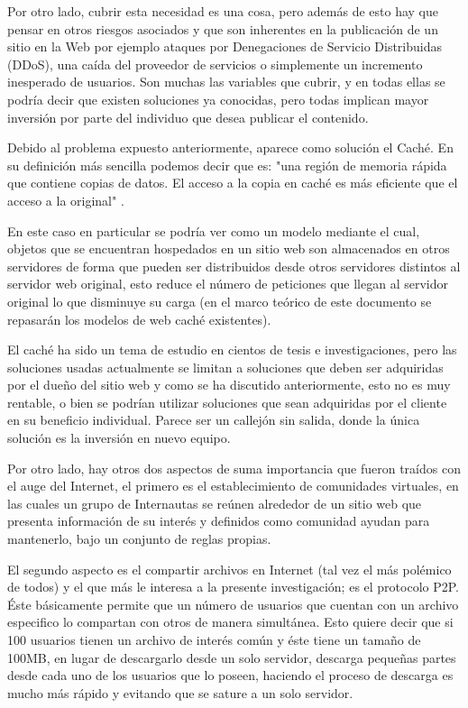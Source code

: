 Por otro lado, cubrir esta necesidad es una cosa, pero además de esto hay que pensar en otros riesgos asociados y que son inherentes en la publicación de un sitio en la Web por ejemplo ataques por Denegaciones de Servicio Distribuidas (DDoS), una caída del proveedor de servicios o simplemente un incremento inesperado de usuarios. Son muchas las variables que cubrir, y en todas ellas se podría decir que existen soluciones ya conocidas, pero todas implican mayor inversión por parte del individuo que desea publicar el contenido. 

Debido al problema expuesto anteriormente, aparece como solución el Caché. En su definición más sencilla podemos decir que es: "una región de memoria rápida que contiene copias de datos. El acceso a la copia en caché es más eficiente que el acceso a la original" \cite{silberschatz:2008}. 

En este caso en particular se podría ver como un modelo mediante el cual, objetos que se encuentran hospedados en un sitio web son almacenados en otros servidores de forma que pueden ser distribuidos desde otros servidores distintos al servidor web original, esto reduce el número de peticiones que llegan al servidor original lo que disminuye su carga (en el marco teórico de este documento se repasarán los modelos de web caché existentes). 

El caché ha sido un tema de estudio en cientos de tesis e investigaciones, pero las soluciones usadas actualmente se limitan a soluciones que deben ser adquiridas por el dueño del sitio web y como se ha discutido anteriormente, esto no es muy rentable, o bien se podrían utilizar soluciones que sean adquiridas por el cliente en su beneficio individual. Parece ser un callejón sin salida, donde la única solución es la inversión en nuevo equipo.

Por otro lado, hay otros dos aspectos de suma importancia que fueron traídos con el auge del Internet, el primero es el establecimiento de comunidades virtuales, en las cuales un grupo de Internautas se reúnen alrededor de un sitio web que presenta información de su interés y definidos como comunidad ayudan para mantenerlo, bajo un conjunto de reglas propias. 

El segundo aspecto es el compartir archivos en Internet (tal vez el más polémico de todos) y el que más le interesa a la presente investigación; es el protocolo P2P. Éste básicamente permite que un número de usuarios que cuentan con un archivo especifico lo compartan con otros de manera simultánea. Esto quiere decir que si 100 usuarios tienen un archivo de interés común y éste tiene un tamaño de 100MB, en lugar de descargarlo desde un solo servidor, descarga pequeñas partes desde cada uno de los usuarios que lo poseen, haciendo el proceso de descarga es mucho más rápido y evitando que se sature a un solo servidor.


